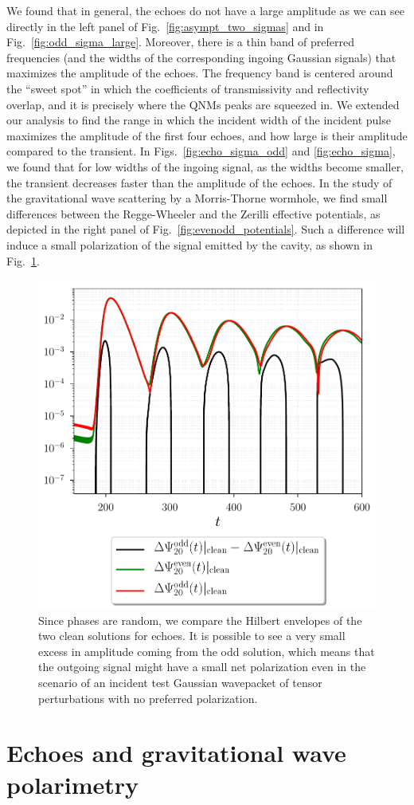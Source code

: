 \documentclass[article,aps,nofootinbib,twocolumn,superscriptaddress]{revtex4-1}
\begin{document}
We found that in general, the echoes do not have a large amplitude as we can see directly in the left panel of Fig.~\ref{fig:asympt_two_sigmas} and in Fig.~\ref{fig:odd_sigma_large}. Moreover, there is a thin band of preferred frequencies (and the widths of the corresponding ingoing Gaussian signals) that maximizes the amplitude of the echoes. The frequency band is centered around the ``sweet spot'' in which the coefficients of transmissivity and reflectivity overlap, and it is precisely where the QNMs peaks are squeezed in. We extended our analysis to find the range in which the incident width of the incident pulse maximizes the amplitude of the first four echoes, and how large is their amplitude compared to the transient. In Figs.~\ref{fig:echo_sigma_odd} and \ref{fig:echo_sigma}, we found that for low widths of the ingoing signal, as the widths become smaller, the transient decreases faster than the amplitude of the echoes. In the study of the gravitational wave scattering by a Morris-Thorne wormhole, we find small differences between the Regge-Wheeler and the Zerilli effective potentials, as depicted in the right panel of Fig.~\ref{fig:evenodd_potentials}. Such a difference will induce a small polarization of the signal emitted by the cavity, as shown in Fig.~\ref{fig:pol}.
\begin{figure}[t!]
\centering
\includegraphics[width=.45\textwidth]{figures/Polarimetry_echo_w_06495.pdf}
\caption{\label{fig:pol} Since phases are random, we compare the Hilbert envelopes of the two clean solutions for echoes. It is possible to see a very small excess in amplitude coming from the odd solution, which means that the outgoing signal might have a small net polarization even in the scenario of an incident test Gaussian wavepacket of tensor perturbations with no preferred polarization.}
\end{figure}

\appendix
\section{Echoes and gravitational wave polarimetry}
\label{sec:AppendixPolar}
\end{document}

